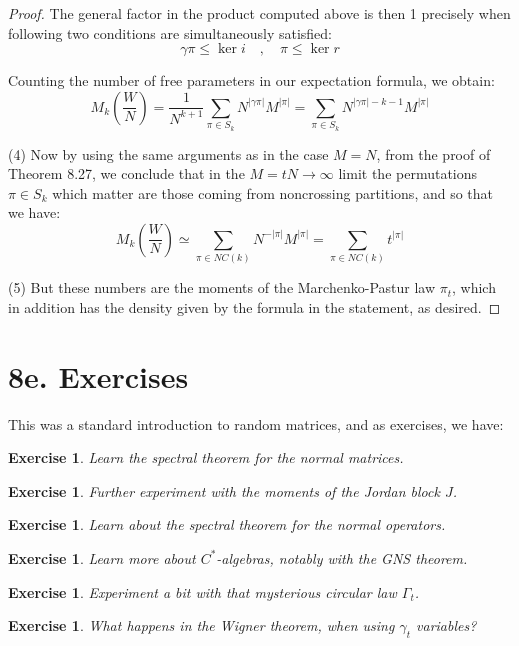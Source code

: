 \documentclass[12pt]{amsbook}
\newtheorem{exercise}[theorem]{Exercise}
\begin{document}
\begin{proof}
The general factor in the product computed above is then 1 precisely when following two conditions are simultaneously satisfied:
$$\gamma\pi\leq\ker i\quad,\quad 
\pi\leq\ker r$$

Counting the number of free parameters in our expectation formula, we obtain:
$$M_k\left(\frac{W}{N}\right)
=\frac{1}{N^{k+1}}\sum_{\pi\in S_k}N^{|\gamma\pi|}M^{|\pi|}
=\sum_{\pi\in S_k}N^{|\gamma\pi|-k-1}M^{|\pi|}$$

(4) Now by using the same arguments as in the case $M=N$, from the proof of Theorem 8.27, we conclude that in the $M=tN\to\infty$ limit the permutations $\pi\in S_k$ which matter are those coming from noncrossing partitions, and so that we have:
$$M_k\left(\frac{W}{N}\right)
\simeq\sum_{\pi\in NC(k)}N^{-|\pi|}M^{|\pi|}
=\sum_{\pi\in NC(k)}t^{|\pi|}$$

(5) But these numbers are the moments of the Marchenko-Pastur law $\pi_t$, which in addition has the density given by the formula in the statement, as desired.
\end{proof}

\section*{8e. Exercises}

This was a standard introduction to random matrices, and as exercises, we have:

\begin{exercise}
Learn the spectral theorem for the normal matrices.
\end{exercise}

\begin{exercise}
Further experiment with the moments of the Jordan block $J$.
\end{exercise}

\begin{exercise}
Learn about the spectral theorem for the normal operators.
\end{exercise}

\begin{exercise}
Learn more about $C^*$-algebras, notably with the GNS theorem.
\end{exercise}

\begin{exercise}
Experiment a bit with that mysterious circular law $\Gamma_t$.
\end{exercise}

\begin{exercise}
What happens in the Wigner theorem, when using $\gamma_t$ variables?
\end{exercise}
\end{document}
